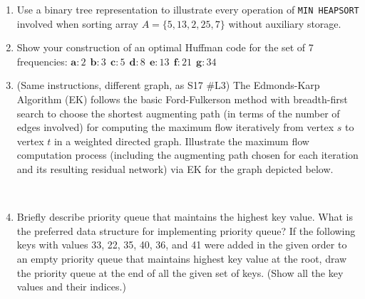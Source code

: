\begin{enumerate}
	\item Use a binary tree representation to illustrate every operation of \verb|MIN HEAPSORT| involved when sorting array $A = \{5,13,2,25,7\}$ without auxiliary storage.
	
	\item Show your construction of an optimal Huffman code for the set of 7 frequencies:  $\mathbf{a}:2 \ \  \mathbf{b}:3 \ \ \mathbf{c}:5 \ \ \mathbf{d}:8 \ \ \mathbf{e}:13 \ \ \mathbf{f}:21 \ \ \mathbf{g}:34$

	\item (Same instructions, different graph, as S17 \#L3)
	The Edmonds-Karp Algorithm (EK) follows the basic Ford-Fulkerson method with breadth-first search to choose the shortest augmenting path (in terms of the number of edges involved) for computing the maximum flow iteratively from vertex $s$ to vertex $t$ in a weighted directed graph.  Illustrate the maximum flow computation process (including the augmenting path chosen for each iteration and its resulting residual network) via EK for the graph depicted below.  
	
\
	
\hfil{}

	\item Briefly describe priority queue that maintains the highest key value.  What is the preferred data structure for implementing priority queue?  If the following keys with values 33, 22, 35, 40, 36, and 41 were added in the given order to an empty priority queue that maintains highest key value at the root, draw the priority queue at the end of all the given set of keys.  (Show all the key values and their indices.)
	

\end{enumerate}
